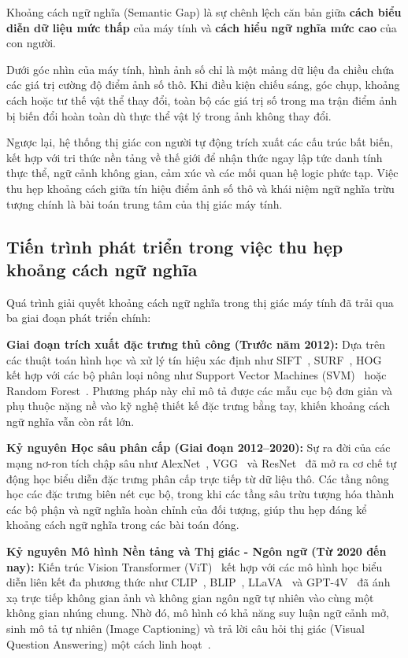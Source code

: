 Khoảng cách ngữ nghĩa (Semantic Gap) là sự chênh lệch căn bản giữa \textbf{cách biểu diễn dữ liệu mức thấp} của máy tính và \textbf{cách hiểu ngữ nghĩa mức cao} của con người.

Dưới góc nhìn của máy tính, hình ảnh số chỉ là một mảng dữ liệu đa chiều chứa các giá trị cường độ điểm ảnh số thô. Khi điều kiện chiếu sáng, góc chụp, khoảng cách hoặc tư thế vật thể thay đổi, toàn bộ các giá trị số trong ma trận điểm ảnh bị biến đổi hoàn toàn dù thực thể vật lý trong ảnh không thay đổi.

Ngược lại, hệ thống thị giác con người tự động trích xuất các cấu trúc bất biến, kết hợp với tri thức nền tảng về thế giới để nhận thức ngay lập tức danh tính thực thể, ngữ cảnh không gian, cảm xúc và các mối quan hệ logic phức tạp. Việc thu hẹp khoảng cách giữa tín hiệu điểm ảnh số thô và khái niệm ngữ nghĩa trừu tượng chính là bài toán trung tâm của thị giác máy tính.

\subsection{Tiến trình phát triển trong việc thu hẹp khoảng cách ngữ nghĩa}

Quá trình giải quyết khoảng cách ngữ nghĩa trong thị giác máy tính đã trải qua ba giai đoạn phát triển chính:

\textbf{Giai đoạn trích xuất đặc trưng thủ công (Trước năm 2012):} Dựa trên các thuật toán hình học và xử lý tín hiệu xác định như SIFT~\citep{lowe2004distinctive}, SURF~\citep{bay2008speeded}, HOG~\citep{dalal2005histograms} kết hợp với các bộ phân loại nông như Support Vector Machines (SVM)~\citep{cortes1995support} hoặc Random Forest~\citep{breiman2001random}. Phương pháp này chỉ mô tả được các mẫu cục bộ đơn giản và phụ thuộc nặng nề vào kỹ nghệ thiết kế đặc trưng bằng tay, khiến khoảng cách ngữ nghĩa vẫn còn rất lớn.

\textbf{Kỷ nguyên Học sâu phân cấp (Giai đoạn 2012--2020):} Sự ra đời của các mạng nơ-ron tích chập sâu như AlexNet~\citep{krizhevsky2012imagenet}, VGG~\citep{simonyan2015very} và ResNet~\citep{he2016deep} đã mở ra cơ chế tự động học biểu diễn đặc trưng phân cấp trực tiếp từ dữ liệu thô. Các tầng nông học các đặc trưng biên nét cục bộ, trong khi các tầng sâu trừu tượng hóa thành các bộ phận và ngữ nghĩa hoàn chỉnh của đối tượng, giúp thu hẹp đáng kể khoảng cách ngữ nghĩa trong các bài toán đóng.

\textbf{Kỷ nguyên Mô hình Nền tảng và Thị giác - Ngôn ngữ (Từ 2020 đến nay):} Kiến trúc Vision Transformer (ViT)~\citep{dosovitskiy2020image} kết hợp với các mô hình học biểu diễn liên kết đa phương thức như CLIP~\citep{radford2021learning}, BLIP~\citep{li2022blip}, LLaVA~\citep{liu2023visual} và GPT-4V~\citep{openai2023gpt4v} đã ánh xạ trực tiếp không gian ảnh và không gian ngôn ngữ tự nhiên vào cùng một không gian nhúng chung. Nhờ đó, mô hình có khả năng suy luận ngữ cảnh mở, sinh mô tả tự nhiên (Image Captioning) và trả lời câu hỏi thị giác (Visual Question Answering) một cách linh hoạt~\citep{dai2023instructblip}.

